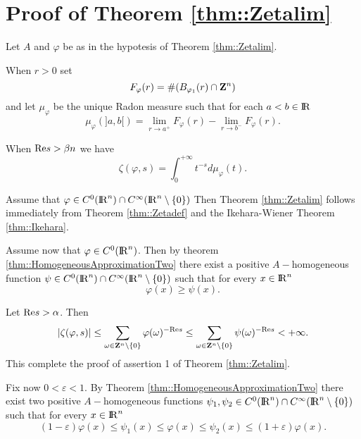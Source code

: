 \documentclass[12pt,a4paper]{amsart}
\begin{document}
\section{\label{section:ProofZetalim}Proof of Theorem \ref{thm::Zetalim}}
Let ${A}$ and ${\varphi}$ be as in the hypotesis of
Theorem \ref{thm::Zetalim}.

When ${r}>0$ set
\begin{equation}\nonumber
F_{\varphi}({r})=\#({B}_{{\varphi}_1}({r})\cap{{\bf Z}}^{n})
\end{equation}
and let ${\mu}_{\varphi}$ be the unique Radon measure 
such that for each $a<b\in{{\rm I\kern-.185em R}}$
\begin{equation}\nonumber
\mu_{\varphi}(]a,b[)=\lim_{{r}\to a^+}F_{\varphi}({r})-
\lim_{{r}\to b^-}F_{\varphi}({r}).
\end{equation}

When ${\mathop{\rm Re}\nolimits}{s}>{\beta}{n}$ we have
\begin{equation}\nonumber
{\zeta}({\varphi},{s})=
\int_0^{+\infty}{t}^{-{s}}d\mu_{\varphi}({t}).
\end{equation}

Assume that ${\varphi}\in C^0({{\rm I\kern-.185em R}}^{n})\cap C^\infty({{\rm I\kern-.185em R}}^{n}\setminus\{0\})$
Then Theorem \ref{thm::Zetalim} follows immediately from
Theorem \ref{thm::Zetadef} and the
Ikehara-Wiener Theorem \ref{thm::Ikehara}.

Assume now that ${\varphi}\in C^0({{\rm I\kern-.185em R}}^{n})$.
Then by theorem \ref{thm::HomogeneousApproximationTwo}
there exist a positive ${A}-$homogeneous function
${\psi}\in C^0({{\rm I\kern-.185em R}}^{n})\cap C^\infty({{\rm I\kern-.185em R}}^{n}\setminus\{0\})$
such that for every ${x}\in{{\rm I\kern-.185em R}}^{n}$
\begin{equation}\nonumber
{\varphi}({x})\geq{\psi}({x}).
\end{equation}

Let ${\mathop{\rm Re}\nolimits}{s}>{\alpha}$. Then
\begin{equation}\nonumber
	{\left|{{\zeta}({\varphi},{s})}\right|}
	\leq\sum_{{\omega}\in{{\bf Z}}^{n}\setminus\{0\}}
		{\varphi}({\omega})^{-{\mathop{\rm Re}\nolimits}{s}}
	\leq\sum_{{\omega}\in{{\bf Z}}^{n}\setminus\{0\}}
		{\psi}({\omega})^{-{\mathop{\rm Re}\nolimits}{s}}
	<+\infty.
\end{equation}
This complete the proof of assertion 1 of Theorem \ref{thm::Zetalim}.

Fix now $0<{\varepsilon}<1$.
By Theorem \ref{thm::HomogeneousApproximationTwo} there exist
two positive ${A}-$homogeneous functions
${\psi}_1,{\psi}_2\in C^0({{\rm I\kern-.185em R}}^{n})\cap C^\infty({{\rm I\kern-.185em R}}^{n}\setminus\{0\})$
such that for every ${x}\in{{\rm I\kern-.185em R}}^{n}$
\begin{equation}\nonumber
	(1-{\varepsilon}){\varphi}({x})
	\leq{\psi}_1({x})
	\leq{\varphi}({x})
	\leq{\psi}_2({x})
	\leq(1+{\varepsilon}){\varphi}({x}).
\end{equation}
\end{document}
